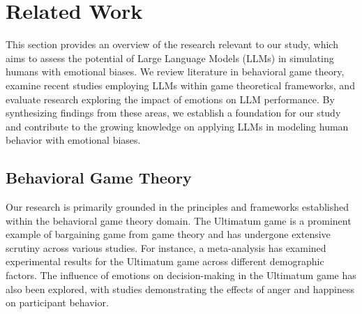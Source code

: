 \documentclass{article}
\begin{document}

 


\section{Related Work}\label{sec:rel_works}

This section provides an overview of the research relevant to our study, which aims to assess the potential of Large Language Models (LLMs) in simulating humans with emotional biases. We review literature in behavioral game theory, examine recent studies employing LLMs within game theoretical frameworks, and evaluate research exploring the impact of emotions on LLM performance. By synthesizing findings from these areas, we establish a foundation for our study and contribute to the growing knowledge on applying LLMs in modeling human behavior with emotional biases.

\subsection{Behavioral Game Theory}
Our research is primarily grounded in the principles and frameworks established within the behavioral game theory domain. The Ultimatum game is a prominent example of bargaining game from game theory and has undergone extensive scrutiny across various studies. For instance, a meta-analysis \cite{RePEc:wly:econjl:v:128:y:2018:i:616:p:3182-3209} has examined experimental results for the Ultimatum game across different demographic factors. The influence of emotions on decision-making in the Ultimatum game has also been explored, with studies demonstrating the effects of anger \cite{fpsyg.2013.00469} and happiness \cite{PROTO2019209} on participant behavior.
\end{document}

